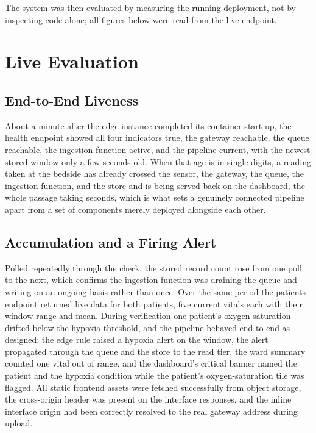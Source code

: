 \documentclass[conference]{IEEEtran}
\begin{document}
The system was then evaluated by measuring the running deployment, not by inspecting code alone; all figures below were read from the live endpoint.

\section{Live Evaluation}

\subsection{End-to-End Liveness}

About a minute after the edge instance completed its container start-up, the health endpoint showed all four indicators true, the gateway reachable, the queue reachable, the ingestion function active, and the pipeline current, with the newest stored window only a few seconds old. When that age is in single digits, a reading taken at the bedside has already crossed the sensor, the gateway, the queue, the ingestion function, and the store and is being served back on the dashboard, the whole passage taking seconds, which is what sets a genuinely connected pipeline apart from a set of components merely deployed alongside each other.

\subsection{Accumulation and a Firing Alert}

Polled repeatedly through the check, the stored record count rose from one poll to the next, which confirms the ingestion function was draining the queue and writing on an ongoing basis rather than once. Over the same period the patients endpoint returned live data for both patients, five current vitals each with their window range and mean. During verification one patient's oxygen saturation drifted below the hypoxia threshold, and the pipeline behaved end to end as designed: the edge rule raised a hypoxia alert on the window, the alert propagated through the queue and the store to the read tier, the ward summary counted one vital out of range, and the dashboard's critical banner named the patient and the hypoxia condition while the patient's oxygen-saturation tile was flagged. All static frontend assets were fetched successfully from object storage, the cross-origin header was present on the interface responses, and the inline interface origin had been correctly resolved to the real gateway address during upload.
\end{document}
